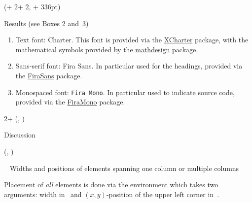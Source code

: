 \documentclass{beamer}
\newlength{\blockThree}
\newlength{\blockFour}
\begin{document}
\begin{frame}[t]
\begin{textblock*}{\colwidth}(\leftmargin + 2\colwidth + 2\colsep, \blockThree + 336pt)

\begin{parblock}{Results {\mdseries(see Boxes 2 and~3)}}
	\vspace{-1.333333\baselineskip}  %
	\begin{enumerate}
		\item \alert{Text font:} \textrm{Charter}. This font is provided via the \href{https://ctan.org/pkg/xcharter}{XCharter} package, with the mathematical symbols provided by the \href{https://ctan.org/pkg/mathdesign}{mathdesign} package. 
		\item \alert{Sans-serif font:} \textsf{Fira Sans}. In particular used for the headings, provided via the \href{https://ctan.org/pkg/fira}{FiraSans} package.
		\item \alert{Monospaced font:} \texttt{Fira Mono}. In particular used to indicate source code, provided via the \href{https://ctan.org/pkg/fira}{FiraMono} package.
	\end{enumerate}
\end{parblock}

\end{textblock*}




\begin{textblock*}{2\colwidth + \colsep}(\leftmargin, \blockFour)

\begin{parblock}{Discussion}
\end{parblock}

\end{textblock*}




\begin{textblock*}{\colwidth}(\leftmargin, \blockFour)

\begin{parblock}{~}  %
	\alert{Widths and positions of elements spanning one column or multiple columns}\vspace{0.333333\baselineskip}

	\noindent Placement of \emph{all} elements is done via the  environment which takes two arguments: width in~\code{\{\}} and $(x, y)$-position of the upper left corner in~\code{()}.


\end{parblock}
\end{textblock*}
\end{frame}
\end{document}
